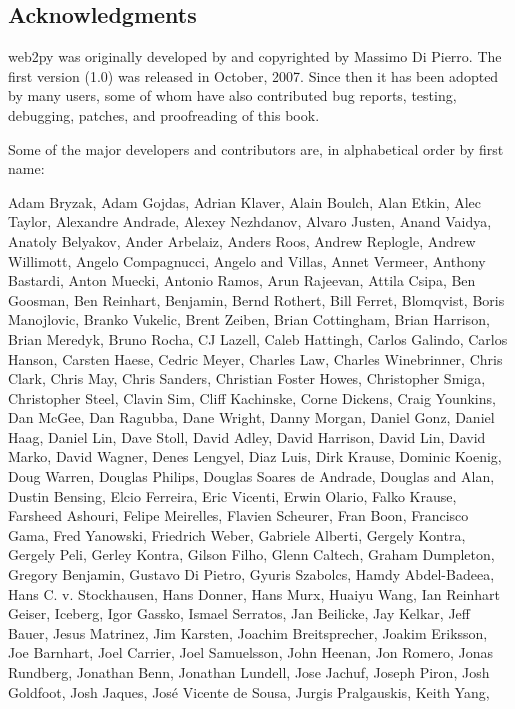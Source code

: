 \documentclass[justified,sixbynine,notoc]{tufte-book}
\begin{document}
\begin{fullwidth}
\goodbreak\section{Acknowledgments}
\noindent web2py was originally developed by and copyrighted by Massimo Di Pierro.
The first version (1.0) was released in October, 2007. Since then it has been adopted by many users, some of whom have also contributed bug reports, testing, debugging, patches, and proofreading of this book.

Some of the major developers and contributors are, in alphabetical order by first name:

Adam Bryzak,
Adam Gojdas,
Adrian Klaver,
Alain Boulch,
Alan Etkin,
Alec Taylor,
Alexandre Andrade,
Alexey Nezhdanov,
Alvaro Justen,
Anand Vaidya,
Anatoly Belyakov,
Ander Arbelaiz,
Anders Roos,
Andrew Replogle,
Andrew Willimott,
Angelo Compagnucci,
Angelo and Villas,
Annet Vermeer,
Anthony Bastardi,
Anton Muecki,
Antonio Ramos,
Arun Rajeevan,
Attila Csipa,
Ben Goosman,
Ben Reinhart,
Benjamin,
Bernd Rothert,
Bill Ferret,
Blomqvist,
Boris Manojlovic,
Branko Vukelic,
Brent Zeiben,
Brian Cottingham,
Brian Harrison,
Brian Meredyk,
Bruno Rocha,
CJ Lazell,
Caleb Hattingh,
Carlos Galindo,
Carlos Hanson,
Carsten Haese,
Cedric Meyer,
Charles Law,
Charles Winebrinner,
Chris Clark,
Chris May,
Chris Sanders,
Christian Foster Howes,
Christopher Smiga,
Christopher Steel,
Clavin Sim,
Cliff Kachinske,
Corne Dickens,
Craig Younkins,
Dan McGee,
Dan Ragubba,
Dane Wright,
Danny Morgan,
Daniel Gonz,
Daniel Haag,
Daniel Lin,
Dave Stoll,
David Adley,
David Harrison,
David Lin,
David Marko,
David Wagner,
Denes Lengyel,
Diaz Luis,
Dirk Krause,
Dominic Koenig,
Doug Warren,
Douglas Philips,
Douglas Soares de Andrade,
Douglas and Alan,
Dustin Bensing,
Elcio Ferreira,
Eric Vicenti,
Erwin Olario,
Falko Krause,
Farsheed Ashouri,
Felipe Meirelles,
Flavien Scheurer,
Fran Boon,
Francisco Gama,
Fred Yanowski,
Friedrich Weber,
Gabriele Alberti,
Gergely Kontra,
Gergely Peli,
Gerley Kontra,
Gilson Filho,
Glenn Caltech,
Graham Dumpleton,
Gregory Benjamin,
Gustavo Di Pietro,
Gyuris Szabolcs,
Hamdy Abdel-Badeea,
Hans C. v. Stockhausen,
Hans Donner,
Hans Murx,
Huaiyu Wang,
Ian Reinhart Geiser,
Iceberg,
Igor Gassko,
Ismael Serratos,
Jan Beilicke,
Jay Kelkar,
Jeff Bauer,
Jesus Matrinez,
Jim Karsten,
Joachim Breitsprecher,
Joakim Eriksson,
Joe Barnhart,
Joel Carrier,
Joel Samuelsson,
John Heenan,
Jon Romero,
Jonas Rundberg,
Jonathan Benn,
Jonathan Lundell,
Jose Jachuf,
Joseph Piron,
Josh Goldfoot,
Josh Jaques,
José Vicente de Sousa,
Jurgis Pralgauskis,
Keith Yang,

\end{fullwidth}
\end{document}
